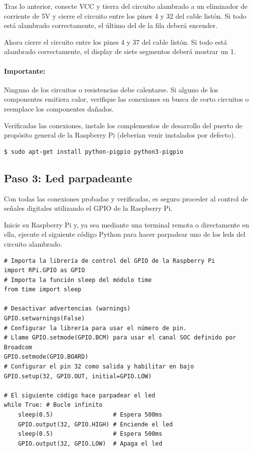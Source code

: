 \documentclass[letterpaper,10.5pt]{article}
\begin{document}
Tras lo anterior, conecte VCC y tierra del circuito alambrado a un eliminador de corriente de 5V y cierre el circuito entre los pines 4 y 32 del cable listón. Si todo está alambrado correctamente, el último del de la fila deberá encender.

Ahora cierre el circuito entre los pines 4 y 37 del cable listón. Si todo está alambrado correctamente, el display de siete segmentos deberá mostrar un 1.

\paragraph{Importante:} Ninguno de los circuitos o resistencias debe calentarse.
Si alguno de los componentes emitiera calor, verifique las conexiones en busca de corto circuitos o reemplace los componentes dañados.

Verificadas las conexiones, instale los complementos de desarrollo del puerto de propósito general de la Raspberry Pi (deberían venir instalados por defecto).

\begin{Verbatim}[fontsize=\footnotesize]
$ sudo apt-get install python-pigpio python3-pigpio
\end{Verbatim}

%
%
\subsection{Paso 3: Led parpadeante}%
\label{sec:step3}
Con todas las conexiones probadas y verificadas, es seguro proceder al control de señales digitales utilizando el GPIO de la Raspberry Pi.

Inicie su Raspberry Pi y, ya sea mediante una terminal remota o directamente en ella, ejecute el siguiente código Python para hacer parpadear uno de los leds del circuito alambrado.

\medskip
\begin{lstlisting}
# Importa la librería de control del GPIO de la Raspberry Pi
import RPi.GPIO as GPIO
# Importa la función sleep del módulo time
from time import sleep

# Desactivar advertencias (warnings)
GPIO.setwarnings(False)
# Configurar la librería para usar el número de pin.
# Llame GPIO.setmode(GPIO.BCM) para usar el canal SOC definido por Broadcom
GPIO.setmode(GPIO.BOARD)
# Configurar el pin 32 como salida y habilitar en bajo
GPIO.setup(32, GPIO.OUT, initial=GPIO.LOW)

# El siguiente código hace parpadear el led
while True: # Bucle infinito
	sleep(0.5)                 # Espera 500ms
	GPIO.output(32, GPIO.HIGH) # Enciende el led
	sleep(0.5)                 # Espera 500ms
	GPIO.output(32, GPIO.LOW)  # Apaga el led
\end{lstlisting}
\medskip
\end{document}
